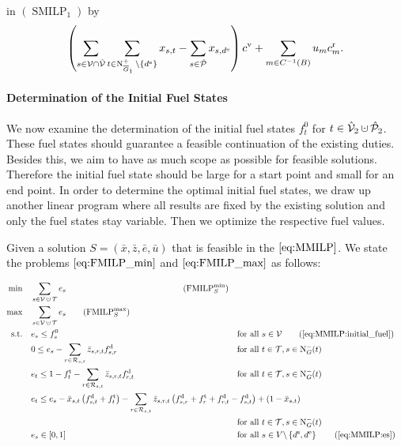 in $(\operatorname{SMILP}_1)$ by
\begin{align*}
	\left(\sum_{s\in\mathcal{V}\cap\hat{\mathcal{V}}} \sum_{t\in\operatorname{N}^+_{\overline{G}_1}\backslash\left\{d^{\operatorname{e}}\right\}} x_{s,t} - \sum_{s\in\hat{\mathcal{P}}} x_{s,d^{\operatorname{e}}}\right) c^{\operatorname{v}} + \sum_{m\in C^{-1}(B)} u_m c^{\operatorname{r}}_m.
\end{align*}

\paragraph{Determination of the Initial Fuel States} \parfill

We now examine the determination of the initial fuel states $f^0_t$ for ${t\in\Vhat_2\cupdot\Phat_2}$. These fuel states should guarantee a feasible continuation of the existing duties. Besides this, we aim to have as much scope as possible for feasible solutions. Therefore the initial fuel state should be large for a start point and small for an end point. In order to determine the optimal initial fuel states, we draw up another linear program where all results are fixed by the existing solution and only the fuel states stay variable. Then we optimize the respective fuel values.

Given a solution ${S=\left(\bar{x},\bar{z},\bar{e},\bar{u}\right)}$ that is feasible in the $\eqref{eq:MMILP}$. We state the problems $\eqref{eq:FMILP_min}$ and $\eqref{eq:FMILP_max}$ as follows:

\begin{align}
	\min \quad & \sum_{s\in\mathcal{V}\cupdot\mathcal{T}} e_s \hphantom{\sum_{s\in\mathcal{V}} \sum_{t\in\Nout(s)\backslash\{d^{\operatorname{e}}\}} x_{s,t}\cv + u_m} \tag{$\operatorname{FMILP}^{\min}_S$} \label{eq:FMILP_min} \\
	\max \quad & \sum_{s\in\mathcal{V}\cupdot\mathcal{T}} e_s \tag{$\operatorname{FMILP}^{\max}_S$} \label{eq:FMILP_max} \\
	\text{s.t.} \quad & e_s \leq f_s^0 & & \text{for all } s\in\mathcal{V} \tag{\ref{eq:MMILP:initial_fuel}} \\
	& 0 \leq e_s - \sum_{r\in\Rst} \bar{z}_{s,r,t}\fd_{s,r} & & \text{for all } t\in\mathcal{T}, s\in\Nin(t) \label{eq:FMILP:min_fuel} \\
	& e_t \leq 1 - \ft_t - \sum_{r\in\Rst} \bar{z}_{s,r,t}\fd_{r,t} & & \text{for all } t\in\mathcal{T}, s\in\Nin(t) \label{eq:FMILP:max_fuel} \\
	& \omit\rlap{$\displaystyle{e_t \leq e_s - \bar{x}_{s,t}\left(f_{s,t}^{\operatorname{d}}+f_t^{\operatorname{t}}\right) - \sum_{r\in\Rst} \bar{z}_{s,r,t}\left(\fd_{s,r}+\ft_r+\fd_{r,t}-\fd_{s,t}\right) + \left(1-\bar{x}_{s,t}\right)}$} \nonumber \\
	& & & \text{for all } t\in\mathcal{T}, s\in\Nin(t) \label{eq:FMILP:fuel_consumption} \\
	& e_s\in[0,1] & & \text{for all } s\in V\backslash\left\{d^{\operatorname{s}},d^{\operatorname{e}}\right\} \tag{\ref{eq:MMILP:es}}
\end{align}

